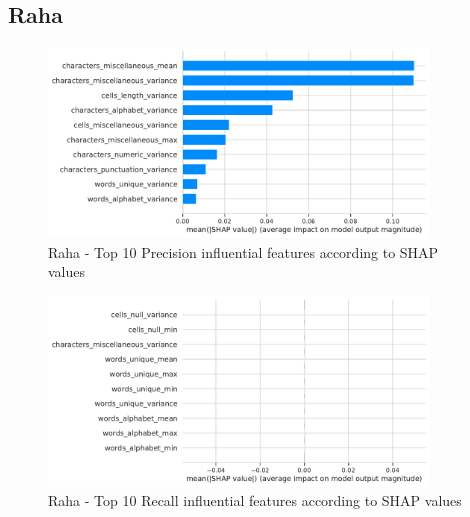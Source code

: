 \subsection{Raha}
\begin{figure}[H]
    \centering
    \includegraphics[width=0.9\textwidth]{thesis/Figures/RQ4/Shap_cell_prec_Raha.pdf}
    \caption{Raha - Top 10 Precision influential features according to SHAP values}
    \label{fig:feature_importance_prec_Raha}
\end{figure}
\begin{figure}[H]
    \centering
    \includegraphics[width=0.9\textwidth]{thesis/Figures/RQ4/Shap_cell_rec_Raha.pdf}
    \caption{Raha - Top 10 Recall influential features according to SHAP values}
    \label{fig:feature_importance_rec_Raha}
\end{figure}